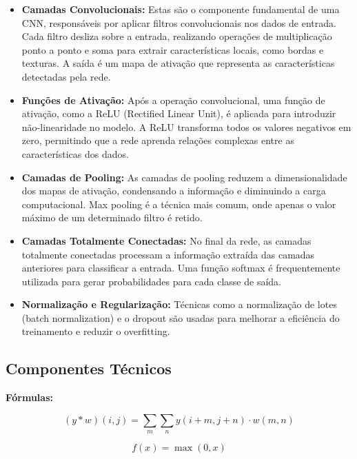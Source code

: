 \begin{itemize}
    \item \textbf{Camadas Convolucionais:}  
    Estas são o componente fundamental de uma CNN, responsáveis por aplicar filtros convolucionais nos dados de entrada. Cada filtro desliza sobre a entrada, realizando operações de multiplicação ponto a ponto e soma para extrair características locais, como bordas e texturas. A saída é um mapa de ativação que representa as características detectadas pela rede.

    \item \textbf{Funções de Ativação:}  
    Após a operação convolucional, uma função de ativação, como a ReLU (Rectified Linear Unit), é aplicada para introduzir não-linearidade no modelo. A ReLU transforma todos os valores negativos em zero, permitindo que a rede aprenda relações complexas entre as características dos dados.

    \item \textbf{Camadas de Pooling:}  
    As camadas de pooling reduzem a dimensionalidade dos mapas de ativação, condensando a informação e diminuindo a carga computacional. Max pooling é a técnica mais comum, onde apenas o valor máximo de um determinado filtro é retido.

    \item \textbf{Camadas Totalmente Conectadas:}  
    No final da rede, as camadas totalmente conectadas processam a informação extraída das camadas anteriores para classificar a entrada. Uma função softmax é frequentemente utilizada para gerar probabilidades para cada classe de saída.

    \item \textbf{Normalização e Regularização:}  
    Técnicas como a normalização de lotes (batch normalization) e o dropout são usadas para melhorar a eficiência do treinamento e reduzir o overfitting.
\end{itemize}

\subsection{Componentes Técnicos}

\textbf{Fórmulas:}

\begin{equation}
(y * w)(i, j) = \sum_{m}\sum_{n} y(i+m, j+n) \cdot w(m, n)
\end{equation}

\begin{equation}
f(x) = \max(0, x)
\end{equation}

